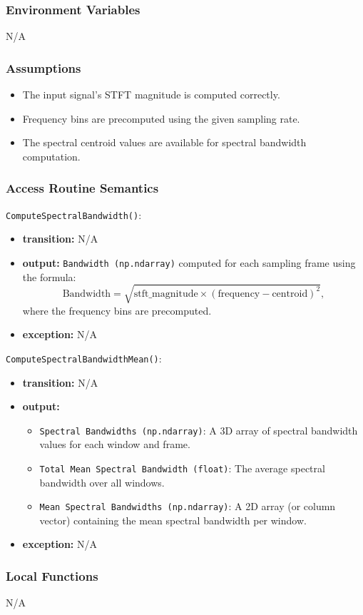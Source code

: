 \documentclass[12pt, titlepage]{article}
\begin{document}
{\subsubsection{Environment Variables}
N/A

\subsubsection{Assumptions}
\begin{itemize}
    \item The input signal's STFT magnitude is computed correctly.
    \item Frequency bins are precomputed using the given sampling rate.
    \item The spectral centroid values are available for spectral bandwidth computation.
\end{itemize}

\subsubsection{Access Routine Semantics}

\noindent \texttt{ComputeSpectralBandwidth()}:
\begin{itemize}
    \item \textbf{transition:} N/A
    \item \textbf{output:} \texttt{Bandwidth (np.ndarray)} computed for each sampling frame using the formula:
    \[
    \text{Bandwidth} = \sqrt{\text{stft\_magnitude} \times \left( \text{frequency} - \text{centroid} \right)^2},
    \]
    where the frequency bins are precomputed.
    \item \textbf{exception:} N/A
\end{itemize}

\noindent \texttt{ComputeSpectralBandwidthMean()}:
\begin{itemize}
    \item \textbf{transition:} N/A
    \item \textbf{output:} 
    \begin{itemize}
        \item \texttt{Spectral Bandwidths (np.ndarray)}: A 3D array of spectral bandwidth values for each window and frame.
        \item \texttt{Total Mean Spectral Bandwidth (float)}: The average spectral bandwidth over all windows.
        \item \texttt{Mean Spectral Bandwidths (np.ndarray)}: A 2D array (or column vector) containing the mean spectral bandwidth per window.
    \end{itemize}
    \item \textbf{exception:} N/A
\end{itemize}

\subsubsection{Local Functions}
N/A
}
\end{document}

